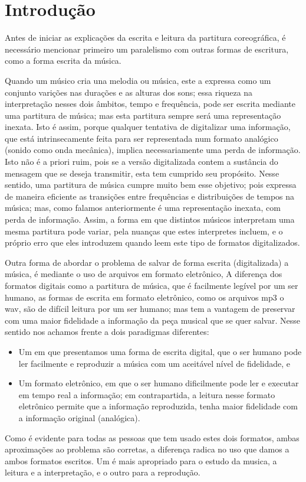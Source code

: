 
\chapter{Introdução}

Antes de iniciar as explicações da escrita e leitura da partitura coreográfica,
é necessário mencionar primeiro um paralelismo com outras formas de escritura,
como a forma escrita da música.

Quando um músico  cria una melodia ou música, este a expressa como um conjunto varições nas durações e as alturas dos sons;
 essa riqueza na interpretação nesses dois âmbitos, tempo e frequência,
pode ser escrita mediante uma partitura de  música; 
mas esta partitura sempre será uma representação inexata.  
Isto é assim, 
porque qualquer tentativa de digitalizar uma informação, 
que está intrinsecamente feita  para ser representada num formato analógico (sonido como onda mecânica),
implica necessariamente uma perda de informação.
Isto não é a priori ruim, 
pois se a versão digitalizada contem a sustância do mensagem que se deseja transmitir,
esta tem cumprido seu propósito.
Nesse sentido, uma partitura de música cumpre muito bem esse objetivo;
pois expressa de maneira eficiente as transições entre frequências e distribuições de tempos na música;
mas, como falamos anteriormente é uma representação inexata, com perda de informação.
Assim, a forma em que distintos músicos interpretam uma mesma partitura pode variar, 
pela nuanças que estes interpretes incluem, 
e o próprio erro que eles introduzem quando leem este tipo de formatos digitalizados.

Outra forma de abordar o problema de salvar de forma escrita (digitalizada) a música, 
é mediante o uso de arquivos em formato eletrônico,
A diferença dos formatos digitais como a partitura de música,
que é facilmente legível por um ser humano, as formas de escrita em formato eletrônico, 
como os arquivos mp3 o wav, são de difícil leitura por um ser humano;
mas tem a vantagem de preservar com uma maior fidelidade a informação da peça musical que se quer salvar.
Nesse sentido nos achamos frente a dois paradigmas diferentes:
\begin{itemize}
\item Um em que presentamos uma forma de escrita digital, que o ser humano pode ler facilmente 
e reproduzir a música com um aceitável nível de fidelidade, e 
\item Um formato eletrônico, em que o ser humano dificilmente pode ler e executar em tempo real a informação;
em contrapartida, a leitura nesse formato eletrônico permite que a informação reproduzida, 
tenha maior fidelidade com a informação original (analógica). 
\end{itemize}

Como é evidente para todas as pessoas que tem usado estes dois  formatos,
ambas aproximações ao problema são corretas,
a diferença radica no uso que damos  a ambos formatos escritos.
Um é mais apropriado para o estudo da musica, a leitura e a interpretação,  
e o outro para a reprodução.
